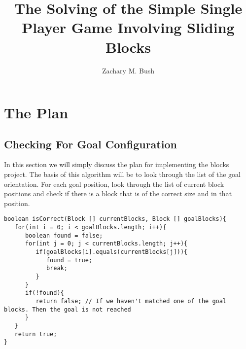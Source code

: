 \documentclass[a4paper]{article}
\begin{document}
\title{The Solving of the Simple Single Player Game Involving Sliding Blocks}
\author{Zachary M. Bush}
\maketitle
\tableofcontents
\lstlistoflistings
\newpage
\section{The Plan}
\subsection{Checking For Goal Configuration}
In this section we will simply discuss the plan for implementing the blocks project. The basis of this algorithm will be to look through the list of the goal orientation. For each goal position, look through the list of current block positions and check if there is a block that is of the correct size and in that position. 
\begin{lstlisting}[caption=Checking for Goal Configuration]
boolean isCorrect(Block [] currentBlocks, Block [] goalBlocks){
   for(int i = 0; i < goalBlocks.length; i++){
      boolean found = false;
      for(int j = 0; j < currentBlocks.length; j++){
         if(goalBlocks[i].equals(currentBlocks[j])){
            found = true;
            break;
         }
      }
      if(!found){
         return false; // If we haven't matched one of the goal blocks. Then the goal is not reached
      }
   }
   return true;
}
\end{lstlisting}
\end{document}
